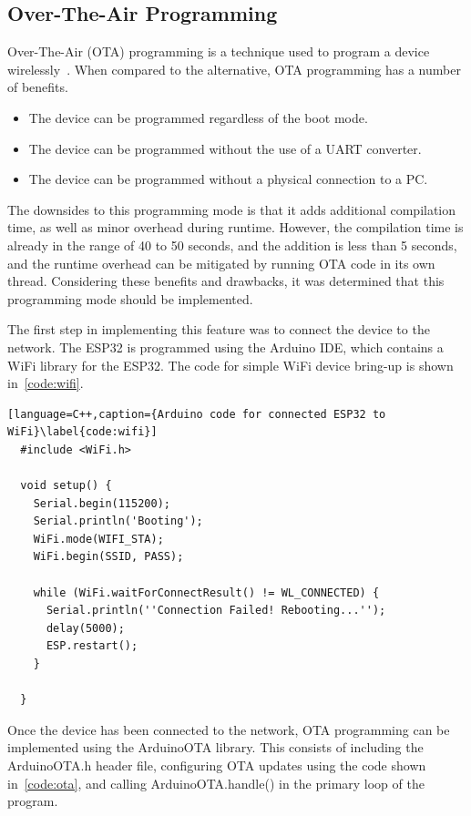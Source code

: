 \subsection{Over-The-Air Programming}
Over-The-Air (OTA) programming is a technique used to program a device wirelessly~\cite{Quadri:2014}.
When compared to the alternative, OTA programming has a number of benefits.

\begin{itemize}
        \item The device can be programmed regardless of the boot mode.
        \item The device can be programmed without the use of a UART converter.
        \item The device can be programmed without a physical connection to a PC.
\end{itemize}

The downsides to this programming mode is that it adds additional compilation time, as well as minor overhead during runtime.
However, the compilation time is already in the range of 40 to 50 seconds, and the addition is less than 5 seconds,
and the runtime overhead can be mitigated by running OTA code in its own thread.
Considering these benefits and drawbacks, it was determined that this programming mode should be implemented.

The first step in implementing this feature was to connect the device to the network.
The ESP32 is programmed using the Arduino IDE, which contains a WiFi library for the ESP32.
The code for simple WiFi device bring-up is shown in~\autoref{code:wifi}.

\begin{lstlisting}[language=C++,caption={Arduino code for connected ESP32 to WiFi}\label{code:wifi}]
  #include <WiFi.h>

  void setup() {
    Serial.begin(115200);
    Serial.println('Booting');
    WiFi.mode(WIFI_STA);
    WiFi.begin(SSID, PASS);

    while (WiFi.waitForConnectResult() != WL_CONNECTED) {
      Serial.println(''Connection Failed! Rebooting...'');
      delay(5000);
      ESP.restart();
    }

  }
\end{lstlisting}

Once the device has been connected to the network, OTA programming can be implemented using the ArduinoOTA library.
This consists of including the ArduinoOTA.h header file,
configuring OTA updates using the code shown in~\autoref{code:ota},
and calling ArduinoOTA.handle() in the primary loop of the program.

